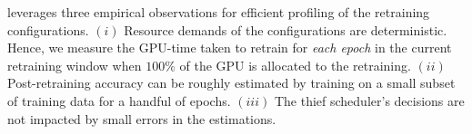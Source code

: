 


\name leverages three empirical observations for efficient profiling of the retraining configurations. 
$(i)$ Resource demands of the configurations are deterministic. Hence, we measure the GPU-time taken to retrain for {\em each epoch} in the current retraining window when $100\%$ of the GPU is allocated to the retraining. %
$(ii)$ Post-retraining accuracy can be roughly estimated by training on a small subset of training data for a handful of epochs.
$(iii)$ The thief scheduler's decisions are not impacted by small errors in the estimations.%

